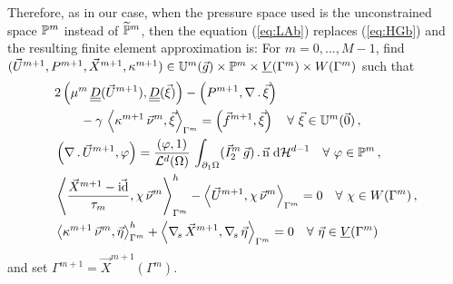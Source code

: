 Therefore, as in our case, when the pressure space used is the unconstrained
space $\mathbb{P}^m$ instead of $\widetilde{\mathbb{P}}^m$, then the equation (\ref{eq:LAb})
replaces (\ref{eq:HGb}) and the resulting finite element approximation is: For
$m=0,\ldots, M-1$, find ${(\vec U^{m+1}, P^{m+1}, \vec X^{m+1}, \kappa^{m+1})
\in \mathbb{U}^{m}(\vec{g})\times \mathbb{P}^m \times \underline{V}(\Gamma^m) \times W(\Gamma^m)}$ such that
\begin{subequations}
\begin{align}
& 2\left(\mu^m\,\mat D(\vec U^{m+1}), \mat D(\vec \xi) \right)
- \left(P^{m+1}, \nabla\,.\,\vec \xi\right) \nonumber \\
& \qquad - \gamma\,\left\langle
\kappa^{m+1}\,\vec\nu^m,\vec\xi\right\rangle_{\Gamma^m}
= \left(\vec f^{m+1},\vec \xi\right) \quad \forall\ \vec\xi \in
\uspacedisc{0}{m}\,, \label{eq:HGcorrecteda}\\
& \left(\nabla\,.\,\vec U^{m+1}, \varphi\right)  =
\frac{\left(\varphi, 1\right)}{\vol(\Omega)}\, \int_{\partial_1\Omega}
(\vec I^m_2\,\vec g) \,.\, \unitn \dH{d-1}
\quad \forall\ \varphi \in \pspace^m\,,\label{eq:HGcorrectedb} \\
&  \left\langle \frac{\vec X^{m+1} - \vec\id}{\tau_m} ,\chi\,\vec\nu^m
\right\rangle_{\Gamma^m}^h - \left\langle \vec U^{m+1}, \chi\,\vec\nu^m
\right\rangle_{\Gamma^m}  = 0 \quad \forall\ \chi \in \Wh\,,
\label{eq:HGcorrectedc} \\
& \left\langle \kappa^{m+1}\,\vec\nu^m, \vec\eta \right\rangle_{\Gamma^m}^h
+ \left\langle \nabs\,\vec X^{m+1}, \nabs\,\vec \eta \right\rangle_{\Gamma^m} =
0 \quad \forall\ \vec\eta \in \Vh \label{eq:HGcorrectedd}
\end{align}
\end{subequations}
and set $\Gamma^{m+1} = \vec X^{m+1}(\Gamma^m)$.

